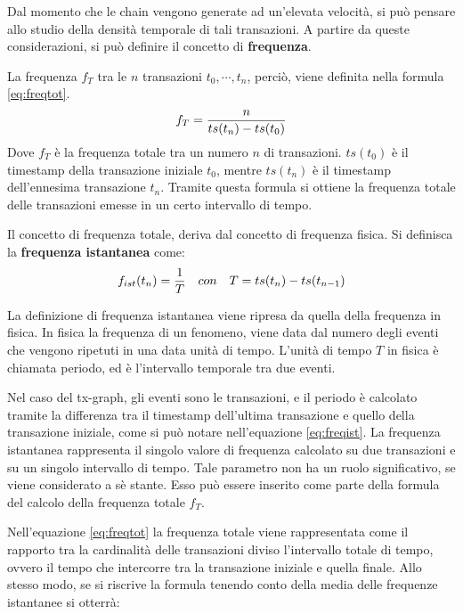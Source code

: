 Dal momento che le chain vengono generate ad un'elevata velocità, si può pensare allo studio della densità temporale di tali transazioni. A partire da queste considerazioni, si può definire il concetto di \textbf{frequenza}.

La frequenza $f_T$ tra le $n$ transazioni $t_0,\cdots,t_n$, perciò, viene definita nella formula \ref{eq:freqtot}.
\begin{equation}
\centering
f_T = \frac{n}{ts(t_n) - ts(t_0)}
\label{eq:freqtot}
\end{equation}
Dove $f_T$ è la frequenza totale tra un numero $n$ di transazioni. $ts(t_0)$ è il timestamp della transazione iniziale $t_0$, mentre $ts(t_n)$ è il timestamp dell'ennesima transazione $t_n$. Tramite questa formula si ottiene la frequenza totale delle transazioni emesse in un certo intervallo di tempo.

Il concetto di frequenza totale, deriva dal concetto di frequenza fisica. Si definisca la \textbf{frequenza istantanea} come:
\begin{equation}
\centering
f_{ist}(t_n) = \frac{1}{T}
\quad con \quad
T = ts(t_n) - ts(t_{n-1})
\label{eq:freqist}
\end{equation}

La definizione di frequenza istantanea viene ripresa da quella della frequenza in fisica. In fisica la frequenza di un fenomeno, viene data dal numero degli eventi che vengono ripetuti in una data unità di tempo. L'unità di tempo $T$ in fisica è chiamata periodo, ed è l'intervallo temporale tra due eventi.

Nel caso del tx-graph, gli eventi sono le transazioni, e il periodo è calcolato tramite la differenza tra il timestamp dell'ultima transazione e quello della transazione iniziale, come si può notare nell'equazione \ref{eq:freqist}. La frequenza istantanea rappresenta il singolo valore di frequenza calcolato su due transazioni e su un singolo intervallo di tempo. Tale parametro non ha un ruolo significativo, se viene considerato a sè stante. Esso può essere inserito come parte della formula del calcolo della frequenza totale $f_T$. 

Nell'equazione \ref{eq:freqtot} la frequenza totale viene rappresentata come il rapporto tra la cardinalità delle transazioni diviso l'intervallo totale di tempo, ovvero il tempo che intercorre tra la transazione iniziale e quella finale. Allo stesso modo, se si riscrive la formula tenendo conto della media delle frequenze istantanee si otterrà:


